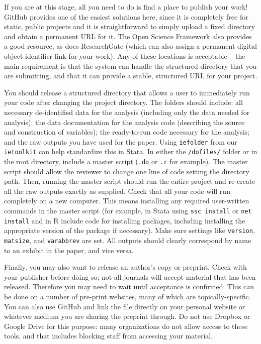 If you are at this stage,
all you need to do is find a place to publish your work!
GitHub provides one of the easiest solutions here,
since it is completely free for static, public projects
and it is straightforward to simply upload a fixed directory
and obtain a permanent URL for it.
The Open Science Framework also provides a good resource,
as does ResearchGate (which can also assign a permanent
digital object identifier link for your work).
Any of these locations is acceptable --
the main requirement is that the system can handle
the structured directory that you are submitting,
and that it can provide a stable, structured URL for your project.

You should release a structured directory that allows a user
to immediately run your code after changing the project directory.
The folders should include:
all necessary de-identified data for the analysis
(including only the data needed for analysis);
the data documentation for the analysis code
(describing the source and construction of variables);
the ready-to-run code necessary for the analysis; and
the raw outputs you have used for the paper.
Using \texttt{iefolder} from our \texttt{ietoolkit} can help standardize this in Stata.
In either the \texttt{/dofiles/} folder or in the root directory,
include a master script (\texttt{.do} or \texttt{.r} for example).
The master script should allow the reviewer to change
one line of code setting the directory path.
Then, running the master script should run the entire project
and re-create all the raw outputs exactly as supplied.
Check that all your code will run completely on a new computer.
This means installing any required user-written commands in the master script
(for example, in Stata using \texttt{ssc install} or \texttt{net install}
and in R include code for installing packages,
including installing the appropriate version of the package if necessary).
Make sure settings like \texttt{version}, \texttt{matsize}, and \texttt{varabbrev} are set.
All outputs should clearly correspond by name to an exhibit in the paper, and vice versa.

Finally, you may also want to release an author's copy or preprint.
Check with your publisher before doing so;
not all journals will accept material that has been released.
Therefore you may need to wait until acceptance is confirmed.
This can be done on a number of pre-print websites,
many of which are topically-specific.
You can also use GitHub and link the file directly
on your personal website or whatever medium you are
sharing the preprint through.
Do not use Dropbox or Google Drive for this purpose:
many organizations do not allow access to these tools,
and that includes blocking staff from accessing your material.
